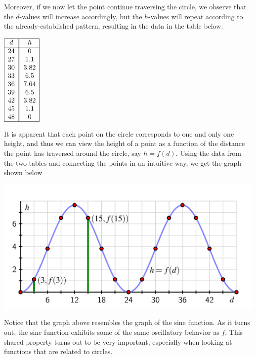 \documentclass[nooutcomes]{ximera}
\begin{document}
Moreover, if we now let the point continue traversing the circle, we observe that the $d$-values will increase accordingly, but the $h$-values will repeat according to the already-established pattern, resulting in the data in the table below.

\begin{center}
$
\begin{array}{ |c || c|  }
 \hline
 d & h\\
 \hline
 24&0\\
 27&1.1\\
 30&3.82\\
 33&6.5\\
 36&7.64\\
 39&6.5\\
 42&3.82\\
 45&1.1\\
 48&0\\
 \hline
\end{array}
$
\end{center}

It is apparent that each point on the circle corresponds to one and only one height, and thus we can view the height of a point as a function of the distance the point has traversed around the circle, say $h = f(d)$.  Using the data from the two tables and connecting the points in an intuitive way, we get the graph shown below

\begin{image}
\includegraphics[width=\textwidth]{traversing-first-example-graph.jpg}
\end{image}


Notice that the graph above resembles the graph of the sine function. As it turns out, the sine function exhibits some of the same oscillatory behavior as $f$. This shared property turns out to be very important, especially when looking at functions that are related to circles. 
\end{document}
